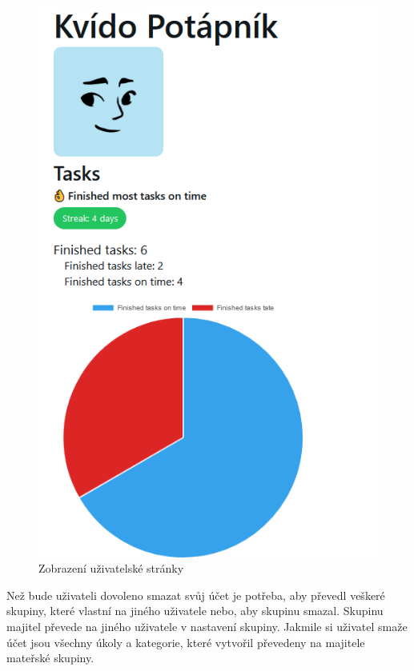 \begin{figure}[hbt!]
	\centering
	\includegraphics[height=0.5\textheight]{img/userPage.png}
	\caption{Zobrazení uživatelské stránky}
\end{figure}

Než bude uživateli dovoleno smazat svůj účet je potřeba, aby převedl veškeré skupiny, které vlastní na jiného uživatele nebo, aby skupinu smazal. Skupinu majitel převede na jiného uživatele v nastavení skupiny. Jakmile si uživatel smaže účet jsou všechny úkoly a kategorie, které vytvořil převedeny na majitele mateřské skupiny.